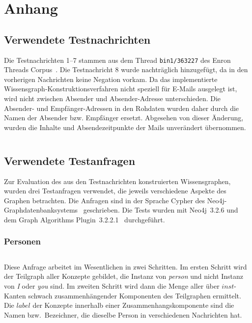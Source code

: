 
\chapter{Anhang}%
\label{sec:appendix}

\section{Verwendete Testnachrichten}%
\label{sec:appendix:msgs}

Die Testnachrichten 1--7 stammen aus dem Thread \texttt{bin1/363227} des Enron Threads Corpus~\cite{EnronThreads}.
Die Testnachricht 8 wurde nachträglich hinzugefügt, da in den vorherigen Nachrichten keine Negation vorkam.
Da das implementierte Wissensgraph-Konstruktionsverfahren nicht speziell für E-Mails ausgelegt ist, wird nicht zwischen Absender und Absender-Adresse unterschieden.
Die Absender- und Empfänger-Adressen in den Rohdaten wurden daher durch die Namen der Absender bzw. Empfänger ersetzt.
Abgesehen von dieser Änderung, wurden die Inhalte und Absendezeitpunkte der Mails unverändert übernommen.
\inputminted{clojure}{data/evaluation/testdata.clj}

\section{Verwendete Testanfragen}%
\label{sec:appendix:queries}

Zur Evaluation des aus den Testnachrichten konstruierten Wissensgraphen, wurden drei Testanfragen verwendet, die jeweils verschiedene Aspekte des Graphen betrachten.
Die Anfragen sind in der Sprache Cypher des Neo4j-Graphdatenbanksystems~\cite{Neo4j} geschrieben.
Die Tests wurden mit Neo4j~3.2.6 und dem Graph Algorithms Plugin~3.2.2.1~\cite{GraphAlgo} durchgeführt.

\subsection{Personen}%
\label{sec:appendix:queries:people}

\inputminted{cypher}{data/evaluation/people.cql}
Diese Anfrage arbeitet im Wesentlichen in zwei Schritten.
Im ersten Schritt wird der Teilgraph aller Konzepte gebildet, die Instanz von \textit{person} und nicht Instanz von \textit{I} oder \textit{you} sind.
Im zweiten Schritt wird dann die Menge aller über $inst$-Kanten schwach zusammenhängender Komponenten des Teilgraphen ermittelt.
Die $label$ der Konzepte innerhalb einer Zusammenhangskomponente sind die Namen bzw.\ Bezeichner, die dieselbe Person in verschiedenen Nachrichten hat.

